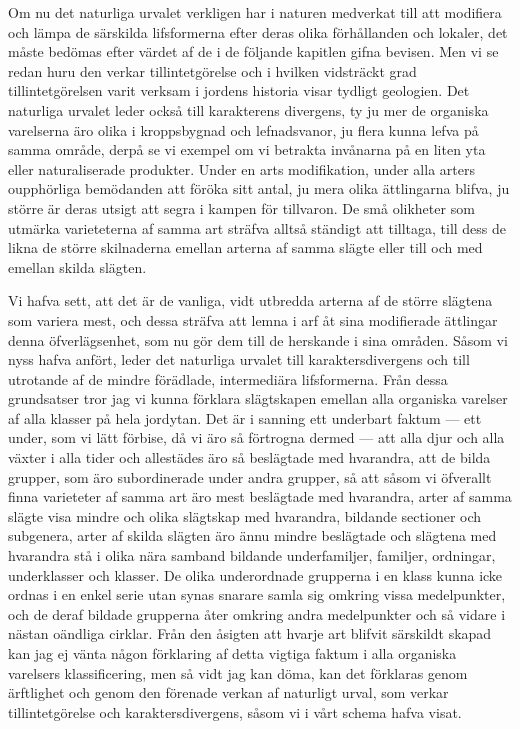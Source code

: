 Om nu det naturliga urvalet verkligen har i naturen medverkat till att modifiera och lämpa de särskilda lifsformerna efter deras olika förhållanden och lokaler, det måste bedömas efter värdet af de i de följande kapitlen gifna bevisen. Men vi se redan huru den verkar tillintetgörelse och i hvilken vidsträckt grad tillintetgörelsen varit verksam i jordens historia visar tydligt geologien. Det naturliga urvalet leder också till karakterens divergens, ty ju mer de organiska varelserna äro olika i kroppsbygnad och lefnadsvanor, ju flera kunna lefva på samma område, derpå se vi exempel om vi betrakta invånarna på en liten yta eller naturaliserade produkter. Under en arts modifikation, under alla arters oupphörliga bemödanden att föröka sitt antal, ju mera olika ättlingarna blifva, ju större är deras utsigt att segra i kampen för tillvaron. De små olikheter som utmärka varieteterna af samma art sträfva alltså ständigt att tilltaga, till dess de likna de större skilnaderna emellan arterna af samma slägte eller till och med emellan skilda slägten.

Vi hafva sett, att det är de vanliga, vidt utbredda arterna af de större slägtena som variera mest, och dessa sträfva att lemna i arf åt sina modifierade ättlingar denna öfverlägsenhet, som nu gör dem till de herskande i sina områden. Såsom vi nyss hafva anfört, leder det naturliga urvalet till karaktersdivergens och till utrotande af de mindre förädlade, intermediära lifsformerna. Från dessa grundsatser tror jag vi kunna förklara slägtskapen emellan alla organiska varelser af alla klasser på hela jordytan. Det är i sanning ett underbart faktum — ett under, som vi lätt förbise, då vi äro så förtrogna dermed — att alla djur och alla växter i alla tider och allestädes äro så beslägtade med hvarandra, att de bilda grupper, som äro subordinerade under andra grupper, så att såsom vi öfverallt finna varieteter af samma art äro mest beslägtade med hvarandra, arter af samma slägte visa mindre och olika slägtskap med hvarandra, bildande sectioner och subgenera, arter af skilda slägten äro ännu mindre beslägtade och slägtena med hvarandra stå i olika nära samband bildande underfamiljer, familjer, ordningar, underklasser och klasser. De olika underordnade grupperna i en klass kunna icke ordnas i en enkel serie utan synas snarare samla sig omkring vissa medelpunkter, och de deraf bildade grupperna åter omkring andra medelpunkter och så vidare i nästan oändliga cirklar. Från den åsigten att hvarje art blifvit särskildt skapad kan jag ej vänta någon förklaring af detta vigtiga faktum i alla organiska varelsers klassificering, men så vidt jag kan döma, kan det förklaras genom ärftlighet och genom den förenade verkan af naturligt urval, som verkar tillintetgörelse och karaktersdivergens, såsom vi i vårt schema hafva visat.

